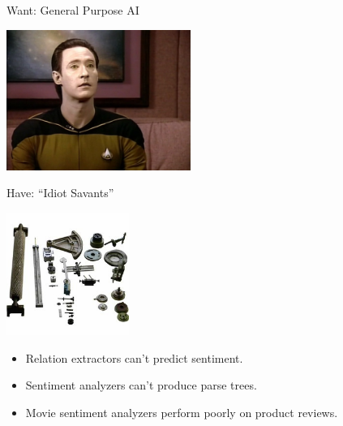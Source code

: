 
\def\title{Want: General Purpose AI}
\begin{frame}{\title}
\begin{center}
\includegraphics[width=6cm]{../img/data.jpg}
\end{center}
\end{frame}

%
%
%
\def\title{Have: ``Idiot Savants''}
\begin{frame}[noframenumbering]{\title}
\begin{center}
\includegraphics[width=4cm]{../img/parts.jpg}
\end{center}

\begin{itemize}
  \item Relation extractors can't predict sentiment.
  \item Sentiment analyzers can't produce parse trees.
  \pause
  \item Movie sentiment analyzers perform poorly on product reviews.
\end{itemize}
\end{frame}

